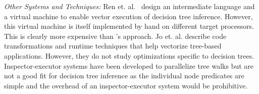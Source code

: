 \emph{Other Systems and Techniques:} Ren et. al.~\cite{PortableVM} design an
intermediate language and a virtual machine to enable vector execution of decision tree
inference. However, this virtual machine is itself implemented by 
hand on different target processors. This is clearly 
more expensive than \Treebeard{}'s approach.
Jo et. al.\cite{MilindTreeVectorization} describe code transformations and runtime 
techniques that help vectorize tree-based applications. However, they do not 
study optimizations specific to decision trees.
Inspector-executor systems \cite{TaoOfParallelism,HybridCPUGPU} have been 
developed to parallelize tree walks but are not a good fit 
for decision tree inference as the individual node predicates are 
simple and the overhead of an inspector-executor system would be prohibitive.

